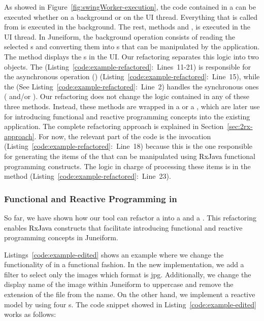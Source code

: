 \documentclass[type=bsc,accentcolor=tud9c]{tudthesis}
\newcommand{\framework}[1]{\textcolor{black}{#1}}
\begin{document}
As showed in Figure~\ref{fig:swingWorker-execution}, the code contained in a  can be executed whether on a background or on the UI thread. Everything that is called from  is executed in the background. The rest, methods  and , is executed in the UI thread. In Juneiform, the background operation consists of reading the selected s and converting them into s that can be manipulated by the application. The method  displays the s in the UI. Our refactoring separates this logic into two objects. The  (Listing~\ref{code:example-refactored}:~Lines~11-21) is responsible for the asynchronous operation () (Listing~\ref{code:example-refactored}:~Line~15), while the  (See Listing~\ref{code:example-refactored}:~Line~2) handles the synchronous ones ( and/or ). Our refactoring does not change the logic contained in any of these three methods. Instead, these methods are wrapped in a  or a , which are later use for introducing functional and reactive programming concepts into the existing application. The complete refactoring approach is explained in Section~\ref{sec:2rx-approach}. For now, the relevant part of the code is the  invocation (Listing~\ref{code:example-refactored}:~Line~18) because this is the one responsible for generating the items of the  that can be manipulated using \framework{RxJava} functional programming constructs. The logic in charge of processing these items is in the method  (Listing~\ref{code:example-refactored}:~Line~23).



\subsubsection{Functional and Reactive Programming in }

So far, we have shown how our tool can refactor a  into a  and a . This refactoring enables \framework{RxJava} constructs that facilitate introducing functional and reactive programming concepts in Juneiform. 

Listings~\ref{code:example-edited} shows an example where we change the functionality of  in a functional fashion. In the new implementation, we add a filter to select only the images which format is jpg. Additionally, we change the display name of the image within Juneiform to uppercase and remove the extension of the file from the name. On the other hand, we implement a reactive model by using four s. The code snippet showed in Listing~\ref{code:example-edited} works as follows:
\end{document}
